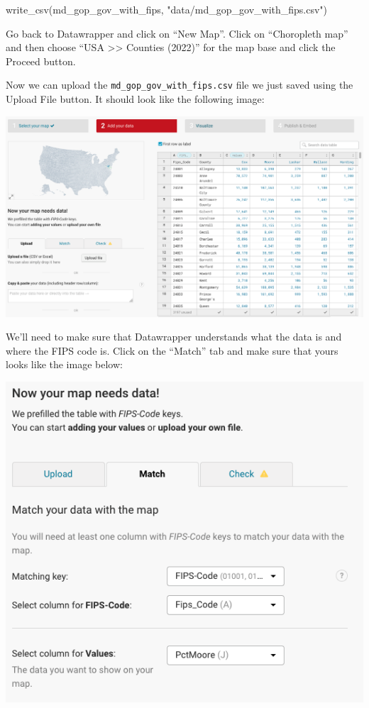 \documentclass[
  letterpaper,
  DIV=11,
  numbers=noendperiod]{scrreprt}
\newenvironment{Shaded}{\begin{snugshade}}{\end{snugshade}}
\newcommand{\FunctionTok}[1]{\textcolor[rgb]{0.28,0.35,0.67}{#1}}
\newcommand{\NormalTok}[1]{\textcolor[rgb]{0.00,0.23,0.31}{#1}}
\newcommand{\StringTok}[1]{\textcolor[rgb]{0.13,0.47,0.30}{#1}}
\begin{document}
\begin{Shaded}
\begin{Highlighting}[]
\FunctionTok{write\_csv}\NormalTok{(md\_gop\_gov\_with\_fips, }\StringTok{"data/md\_gop\_gov\_with\_fips.csv"}\NormalTok{)}
\end{Highlighting}
\end{Shaded}

Go back to Datawrapper and click on ``New Map''. Click on ``Choropleth
map'' and then choose ``USA \textgreater\textgreater{} Counties (2022)''
for the map base and click the Proceed button.

Now we can upload the \texttt{md\_gop\_gov\_with\_fips.csv} file we just
saved using the Upload File button. It should look like the following
image:

\includegraphics{./images/datawrapper7.png}

We'll need to make sure that Datawrapper understands what the data is
and where the FIPS code is. Click on the ``Match'' tab and make sure
that yours looks like the image below:

\includegraphics{./images/datawrapper8.png}
\end{document}
